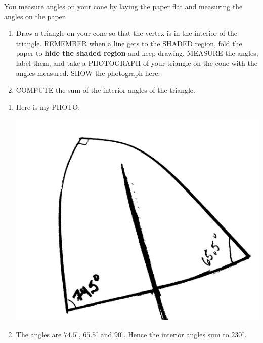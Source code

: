 \documentclass[nooutcomes,noauthor,handout]{ximera}
\begin{document}
\mynewpage



\begin{question}
   You measure angles on your cone by laying the paper flat and
   measuring the angles on the paper.
   \begin{enumerate}
   \item Draw a triangle on your cone so that the vertex is in the
     interior of the triangle. REMEMBER when a line gets to the SHADED
     region, fold the paper to \textbf{hide the shaded region} and
     keep drawing. MEASURE the angles, label them, and take a
     PHOTOGRAPH of your triangle on the cone with the angles
     measured. SHOW the photograph here.
     \item COMPUTE the sum of the interior angles of the triangle.
   \end{enumerate}
   \begin{freeResponse}
     \begin{enumerate}
     \item Here is my PHOTO:
       \begin{center}
         \includegraphics[width=.4\textwidth]{conePhoto.jpg}
       \end{center}
       
     \item The angles are $74.5^\circ$, $65.5^\circ$ and
       $90^\circ$. Hence the interior angles sum to $230^\circ$.
     \end{enumerate}
   \end{freeResponse}
\end{question}

\mynewpage
\end{document}
